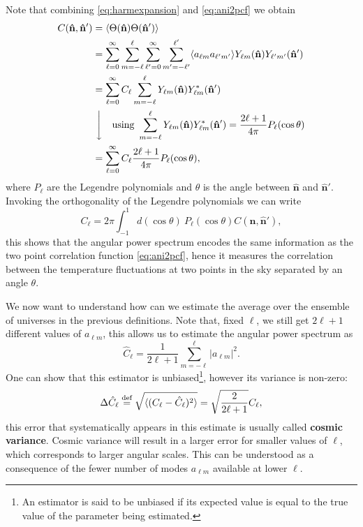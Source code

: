 Note that combining \eqref{eq:harmexpansion} and \eqref{eq:ani2pcf} we obtain
\begin{align*}
    C(\mathbf{\hat{n}},\mathbf{\hat{n}}') &= \langle \Theta(\mathbf{\hat{n}})\Theta(\mathbf{\hat{n}}') \rangle \\ &= \sum_{\ell=0}^{\infty} \sum_{m=-\ell}^{\ell}  \sum_{\ell'=0}^{\infty} \sum_{m'=-\ell'}^{\ell'} \langle a_{\ell m} a_{\ell' m'} \rangle Y_{\ell m}(\mathbf{\hat{n}})Y_{\ell' m'}(\mathbf{\hat{n}}')\\
    &= \sum_{\ell=0}^{\infty}C_{\ell} \sum_{m=-\ell}^{\ell}  Y_{\ell m}(\mathbf{\hat{n}})Y^*_{\ell m}(\mathbf{\hat{n}}')\\
    &\ \Bigg\downarrow\quad \text{using } \sum_{m=-\ell}^{\ell}Y_{\ell m}(\mathbf{\hat{n}})Y^*_{\ell m}(\mathbf{\hat{n}}')=\frac{2\ell+1}{4\pi}P_{\ell}(\cos\theta)\\
    &=\sum_{\ell=0}^{\infty} C_{\ell}\frac{2\ell+1}{4\pi}P_{\ell}(\cos\theta),
    \end{align*}
where $P_{\ell}$ are the Legendre polynomials and $\theta$ is the angle between $\mathbf{\hat{n}}$ and $\mathbf{\hat{n}}'$.
Invoking the orthogonality of the Legendre polynomials we can write
\begin{equation}\label{eq:cl}
    C_{\ell} = 2\pi\int_{-1}^{1}d(\cos\theta)\ P_{\ell}(\cos\theta)C(\mathbf{\hat{n}},\mathbf{\hat{n}}'),
\end{equation}
this shows that the angular power spectrum encodes the same information as the two point correlation function \eqref{eq:ani2pcf}, hence it measures the correlation between the temperature fluctuations at two points in the sky separated by an angle $\theta$.

We now want to understand how can we estimate the average over the ensemble of universes in the previous definitions. Note that, fixed $\ell$, we still get $2\ell+1$ different values of $a_{\ell  m}$, this allows us to estimate the angular power spectrum as
\begin{equation}\label{eq:cl_estimate}
    \hat{C}_{\ell} = \frac{1}{2\ell+1}\sum_{m=-\ell}^{\ell} |a_{\ell m}|^2.
\end{equation}
One can show that this estimator is unbiased\footnote{An estimator is said to be unbiased if its expected value is equal to the true value of the parameter being estimated.}, however its variance is non-zero:
\begin{equation}\label{eq:cl_variance}
    \Delta\hat{C}_{\ell} \stackrel{\text{def}}{=}\sqrt{\langle(C_\ell -\hat C_\ell)^2\rangle} = \sqrt{\frac{2}{2\ell+1}}C_{\ell},
\end{equation} 
this error that systematically appears in this estimate is usually called \textbf{cosmic variance}. Cosmic variance will result in a larger error for smaller values of $\ell$, which corresponds to larger angular scales. This can be understood as a consequence of the fewer number of modes $a_{\ell m}$ available at lower $\ell$.

